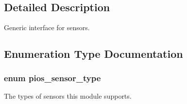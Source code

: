 \subsection{\-Detailed \-Description}
\-Generic interface for sensors. 

\subsection{\-Enumeration \-Type \-Documentation}
\hypertarget{group___p_i_o_s___s_e_n_s_o_r_s_gadad1b67d985a6c9c150a70d23aac96a0}{
\subsubsection[{pios\-\_\-sensor\-\_\-type}]{\setlength{\rightskip}{0pt plus 5cm}enum {\bf pios\-\_\-sensor\-\_\-type}}}\label{group___p_i_o_s___s_e_n_s_o_r_s_gadad1b67d985a6c9c150a70d23aac96a0}


\-The types of sensors this module supports. 

